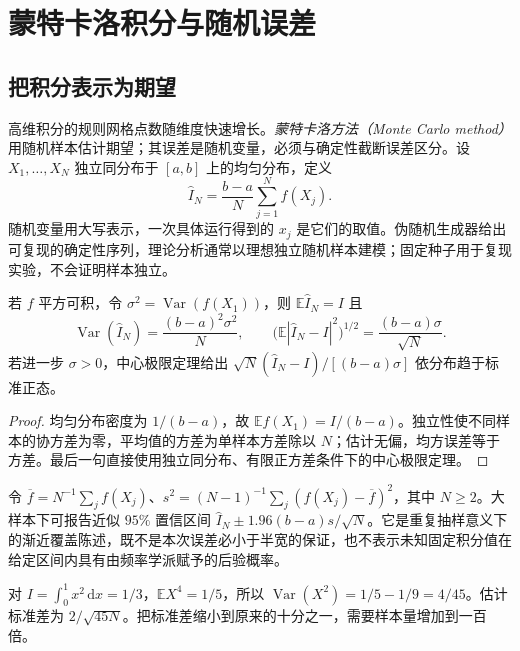 \setcounter{chapter}{12} %
\chapter{蒙特卡洛积分与随机误差}
\label{chap:na-montecarlo}

\section{把积分表示为期望}
高维积分的规则网格点数随维度快速增长。\emph{蒙特卡洛方法（Monte Carlo method）}用随机样本估计期望；其误差是随机变量，必须与确定性截断误差区分。设 $X_1,\ldots,X_N$ 独立同分布于 $[a,b]$ 上的均匀分布，定义
\begin{equation}
 \widehat I_N=\frac{b-a}{N}\sum_{j=1}^Nf(X_j).
 \label{eq:na-mc}
\end{equation}
随机变量用大写表示，一次具体运行得到的 $x_j$ 是它们的取值。伪随机生成器给出可复现的确定性序列，理论分析通常以理想独立随机样本建模；固定种子用于复现实验，不会证明样本独立。

\begin{theorem}[蒙特卡洛估计的均值和方差]
若 $f$ 平方可积，令 $\sigma^2=\operatorname{Var}(f(X_1))$，则 $\mathbb E\widehat I_N=I$ 且
\[
 \operatorname{Var}(\widehat I_N)=\frac{(b-a)^2\sigma^2}{N},\qquad
 \bigl(\mathbb E|\widehat I_N-I|^2\bigr)^{1/2}=\frac{(b-a)\sigma}{\sqrt N}.
\]
若进一步 $\sigma>0$，中心极限定理给出 $\sqrt N(\widehat I_N-I)/[(b-a)\sigma]$ 依分布趋于标准正态。
\end{theorem}
\begin{proof}
均匀分布密度为 $1/(b-a)$，故 $\mathbb E f(X_1)=I/(b-a)$。独立性使不同样本的协方差为零，平均值的方差为单样本方差除以 $N$；估计无偏，均方误差等于方差。最后一句直接使用独立同分布、有限正方差条件下的中心极限定理。
\end{proof}

令 $\overline f=N^{-1}\sum_jf(X_j)$、$s^2=(N-1)^{-1}\sum_j(f(X_j)-\overline f)^2$，其中 $N\ge2$。大样本下可报告近似 $95\%$ 置信区间 $\widehat I_N\pm1.96(b-a)s/\sqrt N$。它是重复抽样意义下的渐近覆盖陈述，既不是本次误差必小于半宽的保证，也不表示未知固定积分值在给定区间内具有由频率学派赋予的后验概率。

\begin{example}[估计平方函数的积分]
对 $I=\int_0^1x^2\,\mathrm dx=1/3$，$\mathbb E X^4=1/5$，所以 $\operatorname{Var}(X^2)=1/5-1/9=4/45$。估计标准差为 $2/\sqrt{45N}$。把标准差缩小到原来的十分之一，需要样本量增加到一百倍。
\end{example}

